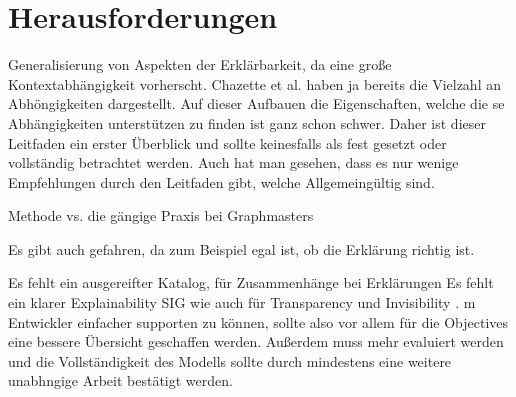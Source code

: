 \section{Herausforderungen}

Generalisierung von Aspekten der Erklärbarkeit, da eine große Kontextabhängigkeit vorherscht. Chazette et al. haben ja bereits die Vielzahl an Abhöngigkeiten dargestellt. Auf dieser Aufbauen die Eigenschaften, welche die se Abhängigkeiten unterstützen zu finden ist ganz schon schwer. Daher ist dieser Leitfaden ein erster Überblick und sollte keinesfalls als fest gesetzt oder vollständig betrachtet werden. Auch hat man gesehen, dass es nur wenige Empfehlungen durch den Leitfaden gibt, welche Allgemeingültig sind.

Methode vs. die gängige Praxis bei Graphmasters

Es gibt auch gefahren, da zum Beispiel egal ist, ob die Erklärung richtig ist.

Es fehlt ein ausgereifter Katalog, für Zusammenhänge bei Erklärungen
Es fehlt ein klarer Explainability SIG wie auch für Transparency \cite{do2010software} und Invisibility \cite{carvalho2020developers}. m Entwickler einfacher supporten zu können, sollte also vor allem für die Objectives eine bessere Übersicht geschaffen werden.
Außerdem muss mehr evaluiert werden und die Vollständigkeit des Modells sollte durch mindestens eine weitere unabhngige Arbeit bestätigt werden.